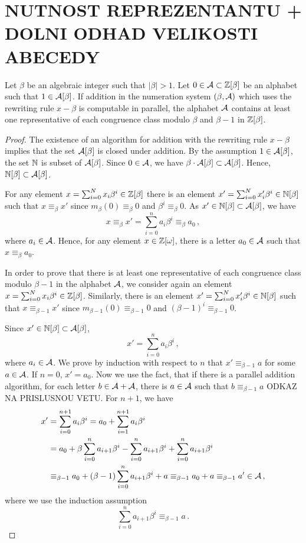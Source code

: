 \section{NUTNOST REPREZENTANTU + DOLNI ODHAD VELIKOSTI ABECEDY}

\begin{thm}
Let $\beta$ be an algebraic integer such that $|\beta|>1$. Let $0\in \mathcal{A}\subset \mathbb{Z}[\beta]$ be an alphabet such that $1\in \mathcal{A}[\beta]$. If addition in the numeration system $(\beta, \mathcal{A})$ which uses the rewriting rule $x-\beta$ is computable in parallel, the alphabet $\mathcal{A}$ contains at least one representative of each congruence class modulo $\beta$ and $\beta-1$ in $\mathbb{Z}[\beta]$. 
\label{thm:representativesInAlphabet}
\end{thm}
\begin{proof}
The existence of an algorithm for addition with the rewriting rule $x-\beta$ implies that the set $\mathcal{A}[\beta]$ is closed under addition. By the assumption $1\in \mathcal{A}[\beta]$, the set $\mathbb{N}$ is subset of  $\mathcal{A}[\beta]$. Since $0\in\mathcal{A}$, we have $\beta \cdot \mathcal{A}[\beta] \subset \mathcal{A}[\beta]$. Hence, $\mathbb{N}[\beta] \subset \mathcal{A}[\beta]$.

For any element  $x=\sum_{i=0}^N x_i \beta^i\in \mathbb{Z}[\beta]$ there is an element $x'=\sum_{i=0}^N x'_i \beta^i\in \mathbb{N}[\beta]$ such that $x\equiv_\beta x'$  since $m_\beta (0)\equiv_\beta 0$ and $\beta^i\equiv_\beta 0$. As $x'\in \mathbb{N}[\beta] \subset \mathcal{A}[\beta]$, we have
$$
x\equiv_\beta x'=\sum_{i=0}^{n}a_i\beta^i \equiv_\beta a_0\,,
$$
where $a_i\in \mathcal{A}$. Hence, for any element $x\in\mathbb{Z}[\omega]$, there is a letter $a_0\in\mathcal{A}$ such that $x\equiv_\beta a_0$.

In order to prove that there is at least one representative of each congruence class modulo $\beta-1$ in the alphabet $\mathcal{A}$, we consider again an element $x=\sum_{i=0}^N x_i \beta^i\in \mathbb{Z}[\beta]$. Similarly, there is an element $x'=\sum_{i=0}^N x'_i \beta^i\in \mathbb{N}[\beta]$ such that $x\equiv_{\beta-1} x'$  since $m_{\beta-1} (0)\equiv_{\beta-1} 0$ and $(\beta-1)^i\equiv_{\beta-1} 0$.

Since $x'\in \mathbb{N}[\beta]\subset \mathcal{A}[\beta]$,
$$
x'=\sum_{i=0}^{n}a_i\beta^i\,,
$$
where $a_i\in \mathcal{A}$. We prove by induction with respect to $n$ that $x'\equiv_{\beta-1} a$ for some $a\in\mathcal{A}$.
If $n=0$, $x'=a_0$. Now we use the fact, that if there is a parallel addition algorithm, for each letter $b \in\mathcal{A}+\mathcal{A}$, there is $a\in\mathcal{A}$ such that $b \equiv_{\beta-1} a$ ODKAZ NA PRISLUSNOU VETU. For $n+1$, we have
\begin{align*}
x'&=\sum_{i=0}^{n+1}a_i\beta^i =a_0 + \sum_{i=1}^{n+1}a_{i}\beta^i\\
    &=a_0 + \beta \sum_{i=0}^{n}a_{i+1}\beta^i - \sum_{i=0}^{n}a_{i+1}\beta^i+ \sum_{i=0}^{n}a_{i+1}\beta^i \\
    &\equiv_{\beta-1} a_0 + (\beta-1)\sum_{i=0}^{n}a_{i+1}\beta^i + a \equiv_{\beta-1}a_0 +a \equiv_{\beta-1}a' \in\mathcal{A}\,,
\end{align*}
where we use the induction assumption
$$
\sum_{i=0}^{n}a_{i+1}\beta^i\equiv_{\beta-1} a\,.
$$
\end{proof}

